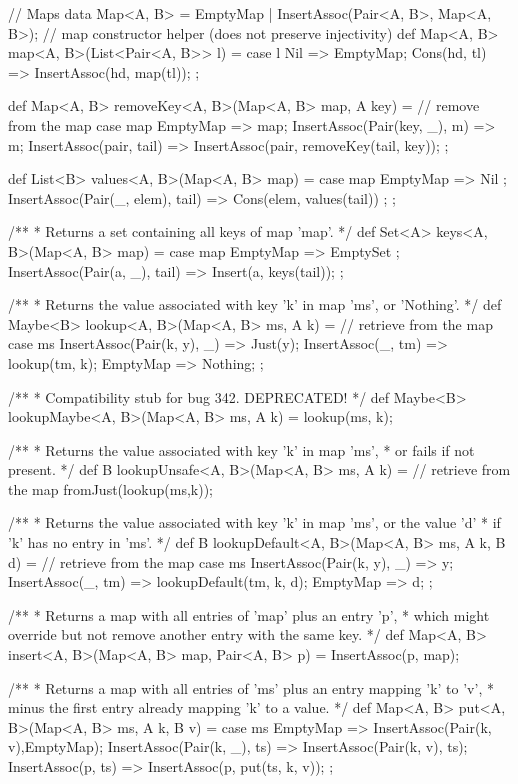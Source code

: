\begin{abscode}
// Maps
data Map<A, B> = EmptyMap | InsertAssoc(Pair<A, B>, Map<A, B>);
 // map constructor helper (does not preserve injectivity)
def Map<A, B> map<A, B>(List<Pair<A, B>> l) =
  case l { 
     Nil => EmptyMap; 
     Cons(hd, tl) => InsertAssoc(hd, map(tl)); 
  };
  
  
def Map<A, B> removeKey<A, B>(Map<A, B> map, A key) = // remove from the map
  case map {
  	EmptyMap => map;
    InsertAssoc(Pair(key, _), m) => m;
    InsertAssoc(pair, tail) => InsertAssoc(pair, removeKey(tail, key));
  };
    

def List<B> values<A, B>(Map<A, B> map) =
  case map {
    EmptyMap => Nil ;
    InsertAssoc(Pair(_, elem), tail) => Cons(elem, values(tail)) ;
  };

/**
 * Returns a set containing all keys of map 'map'.
 */
def Set<A> keys<A, B>(Map<A, B> map) =
  case map { 
    EmptyMap => EmptySet ;
    InsertAssoc(Pair(a, _), tail) => Insert(a, keys(tail)); 
  };
    
/**
 * Returns the value associated with key 'k' in map 'ms', or 'Nothing'.
 */
def Maybe<B> lookup<A, B>(Map<A, B> ms, A k) = // retrieve from the map
  case ms {
     InsertAssoc(Pair(k, y), _) => Just(y);
     InsertAssoc(_, tm) => lookup(tm, k);
     EmptyMap => Nothing;
  };

/**
 * Compatibility stub for bug 342. DEPRECATED!
 */
def Maybe<B> lookupMaybe<A, B>(Map<A, B> ms, A k) = lookup(ms, k);

/**
 * Returns the value associated with key 'k' in map 'ms',
 * or fails if not present.
 */
def B lookupUnsafe<A, B>(Map<A, B> ms, A k) = // retrieve from the map
  fromJust(lookup(ms,k));
  
/**
 * Returns the value associated with key 'k' in map 'ms', or the value 'd'
 * if 'k' has no entry in 'ms'.
 */
def B lookupDefault<A, B>(Map<A, B> ms, A k, B d) = // retrieve from the map
  case ms {
     InsertAssoc(Pair(k, y), \_) => y;
     InsertAssoc(\_, tm) => lookupDefault(tm, k, d);
     EmptyMap => d;
  };

/**
 * Returns a map with all entries of 'map' plus an entry 'p',
 * which might override but not remove another entry with the same key.
 */
def Map<A, B> insert<A, B>(Map<A, B> map, Pair<A, B> p) = InsertAssoc(p, map);

/**
 * Returns a map with all entries of 'ms' plus an entry mapping 'k' to 'v',
 * minus the first entry already mapping 'k' to a value.
 */  
def Map<A, B> put<A, B>(Map<A, B> ms, A k, B v) =
  case ms {
    EmptyMap => InsertAssoc(Pair(k, v),EmptyMap);
    InsertAssoc(Pair(k, \_), ts) => InsertAssoc(Pair(k, v), ts);
    InsertAssoc(p, ts) => InsertAssoc(p, put(ts, k, v));
  };
\end{abscode}

